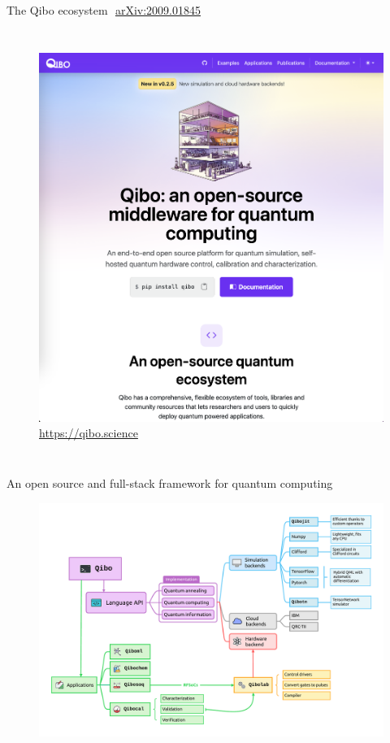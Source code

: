\documentclass[8pt, xcolor={svgnames}, hyperref={linkcolor=black}]{beamer}
\begin{document}
\begin{frame}{The Qibo ecosystem\hfill \faBook\,\, \href{https://arxiv.org/abs/2009.01845}{arXiv:2009.01845}}
\begin{columns}
     \column{4cm}
     \begin{figure}
       \includegraphics[width=\textwidth]{figures/docs.png}
       {\color{blue}\url{https://qibo.science}}
     \end{figure}
   \end{columns}
\end{frame}

\begin{frame}{An open source and full-stack framework for quantum computing}
\begin{figure}
   \includegraphics[width=1\linewidth]{figures/qibo_ecosystem.pdf}
\end{figure}  
\end{frame}
\end{document}

